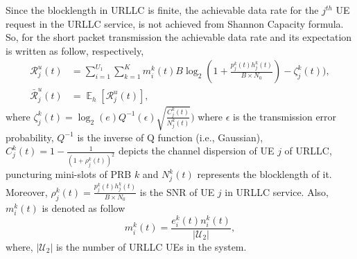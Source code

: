 \documentclass[conference]{IEEEtran}
\DeclareMathOperator{\E}{\mathbb{E}}
\begin{document}
Since the blocklength in URLLC is finite, the achievable data rate for the $j^{th}$ UE request in the URLLC service, is not achieved from Shannon Capacity formula. So, for the short packet transmission the achievable data rate and its expectation is written as follow, respectively, 
\begin{equation}\label{eq11}
\begin{split}
\mathcal{R}_{j}^u(t) &= \sum_{i = 1}^{U_1}\sum_{k=1}^K m_i^{k}(t) B \log_2({1+\frac{p^k_j(t)h^k_j(t)}{B \times N_0}})- \zeta_{j}^k(t)),\\
\bar{\mathcal{R}}_{j}^u(t) &= \E_{h}[\mathcal{R}_{j}^u(t)],
\end{split} 
\end{equation}
where $\zeta_{j}^k(t) = \log_2({e})Q^{-1}(\epsilon) \sqrt{\frac{C_{j}^k(t)}{N_{j}^k(t)}})$
where $\epsilon$ is the transmission error probability, $Q^{-1}$ is the inverse of Q function (i.e., Gaussian),
$C_{j}^k(t) = 1 - \frac{1}{(1+\rho_{j}^k(t))^2}$ depicts the channel dispersion of UE $j$ of URLLC, puncturing mini-slots of PRB $k$ and
$N_{j}^k(t)$ represents the blocklength of it. Moreover, $\rho_{j}^k(t)=\frac{p^k_j(t)h^k_j(t)}{B \times N_0}$ is the SNR of UE $j$ in URLLC service. 
Also, $m_i^{k}(t) $ is denoted as follow
\begin{equation}
m_i^{k}(t)= \frac{e_i^k(t)n^k_i(t)}{|\mathcal{U}_2|},
\end{equation}
where, $|\mathcal{U}_2|$ is the number of URLLC UEs in the system.
\end{document}
